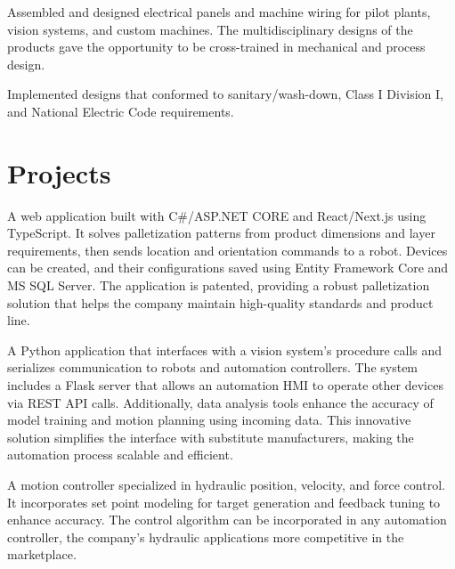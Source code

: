 \documentclass[]{TTurner}
\begin{document}
\begin{minipage}[t]{0.7\textwidth}
\begin{tightemize}
\sectionsep
\item Assembled and designed electrical panels and machine wiring for pilot plants, vision systems, and custom machines. The multidisciplinary designs of the products gave the opportunity to be cross-trained in mechanical and process design. 
\item Implemented designs that conformed to sanitary/wash-down, Class I Division I, and National Electric Code requirements.              
\end{tightemize}
\sectionsep

\section{Projects}

\begin{tightemize}
\item A web application built with C\#/ASP.NET CORE and React/Next.js using TypeScript. It solves palletization patterns from product dimensions and layer requirements, then sends location and orientation commands to a robot. Devices can be created, and their configurations saved using Entity Framework Core and MS SQL Server.  The application is patented, providing a robust palletization solution that helps the company maintain high-quality standards and product line.
\end{tightemize}
\sectionsep

\begin{tightemize}
\item A Python application that interfaces with a vision system's procedure calls and serializes communication to robots and automation controllers. The system includes a Flask server that allows an automation HMI to operate other devices via REST API calls. Additionally, data analysis tools enhance the accuracy of model training and motion planning using incoming data. This innovative solution simplifies the interface with substitute manufacturers, making the automation process scalable and efficient.
\end{tightemize}
\sectionsep

\begin{tightemize}
\item A motion controller specialized in hydraulic position, velocity, and force control. It incorporates set point modeling for target generation and feedback tuning to enhance accuracy. The control algorithm can be incorporated in any automation controller, the company's hydraulic applications more competitive in the marketplace. 
\end{tightemize}
\sectionsep


\end{minipage} 
\end{document}
